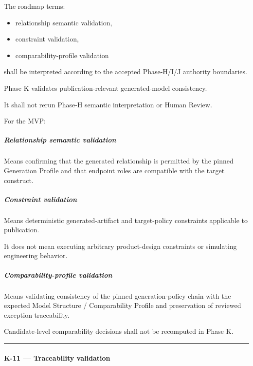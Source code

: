 The roadmap terms:

\begin{itemize}
\tightlist
\item
  relationship semantic validation,
\item
  constraint validation,
\item
  comparability-profile validation
\end{itemize}

shall be interpreted according to the accepted Phase-H/I/J authority boundaries.

Phase K validates publication-relevant generated-model consistency.

It shall not rerun Phase-H semantic interpretation or Human Review.

For the MVP:

\hypertarget{relationship-semantic-validation}{%
\subparagraph{Relationship semantic validation}\label{relationship-semantic-validation}}

Means confirming that the generated relationship is permitted by the pinned Generation Profile and that endpoint roles are compatible with the target construct.

\hypertarget{constraint-validation}{%
\subparagraph{Constraint validation}\label{constraint-validation}}

Means deterministic generated-artifact and target-policy constraints applicable to publication.

It does not mean executing arbitrary product-design constraints or simulating engineering behavior.

\hypertarget{comparability-profile-validation}{%
\subparagraph{Comparability-profile validation}\label{comparability-profile-validation}}

Means validating consistency of the pinned generation-policy chain with the expected Model Structure / Comparability Profile and preservation of reviewed exception traceability.

Candidate-level comparability decisions shall not be recomputed in Phase K.

\begin{center}\rule{0.5\linewidth}{0.5pt}\end{center}

\hypertarget{k-11--traceability-validation}{%
\paragraph{K-11 --- Traceability validation}\label{k-11--traceability-validation}}

